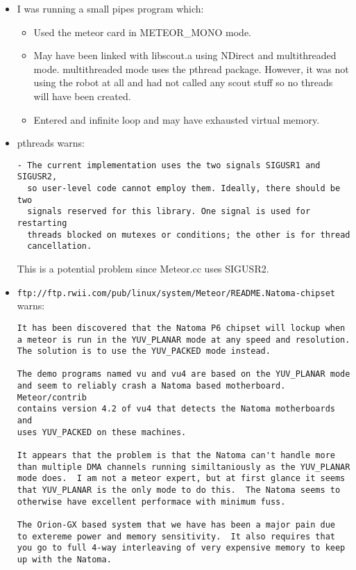 \begin{itemize}
\item
I was running a small pipes program which:
\begin{itemize}
\item
Used the meteor card in METEOR\_MONO mode.
\item
May have been linked with libscout.a using NDirect and multithreaded
mode.  multithreaded mode uses the pthread package.
However, it was not using the robot at all and had not called any scout
stuff so no threads will have been created.
\item
Entered and infinite loop and may have exhausted virtual memory.
\end{itemize}

\item
pthreads warns:
\begin{verbatim}
- The current implementation uses the two signals SIGUSR1 and SIGUSR2,
  so user-level code cannot employ them. Ideally, there should be two
  signals reserved for this library. One signal is used for restarting
  threads blocked on mutexes or conditions; the other is for thread
  cancellation.
\end{verbatim}

This is a potential problem since Meteor.cc uses SIGUSR2.

\item
{\tt ftp://ftp.rwii.com/pub/linux/system/Meteor/README.Natoma-chipset}
warns:
\begin{verbatim}
It has been discovered that the Natoma P6 chipset will lockup when
a meteor is run in the YUV_PLANAR mode at any speed and resolution.
The solution is to use the YUV_PACKED mode instead.

The demo programs named vu and vu4 are based on the YUV_PLANAR mode
and seem to reliably crash a Natoma based motherboard.  Meteor/contrib
contains version 4.2 of vu4 that detects the Natoma motherboards and
uses YUV_PACKED on these machines.

It appears that the problem is that the Natoma can't handle more
than multiple DMA channels running similtaniously as the YUV_PLANAR
mode does.  I am not a meteor expert, but at first glance it seems
that YUV_PLANAR is the only mode to do this.  The Natoma seems to
otherwise have excellent performace with minimum fuss.  

The Orion-GX based system that we have has been a major pain due 
to extereme power and memory sensitivity.  It also requires that
you go to full 4-way interleaving of very expensive memory to keep 
up with the Natoma.


\end{verbatim}
\end{itemize}
